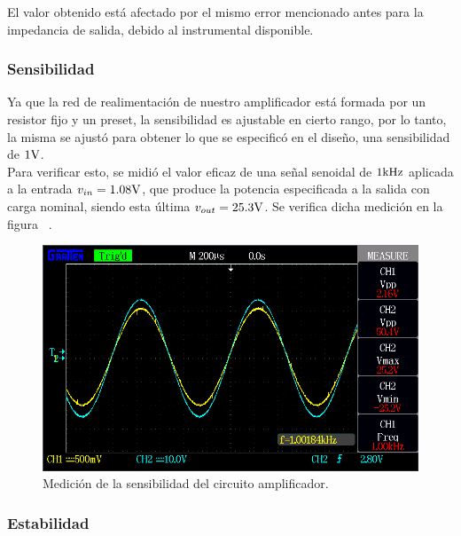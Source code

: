 El valor obtenido está afectado por el mismo error mencionado antes para la impedancia de salida, debido al instrumental disponible.


\vfill

\clearpage


\subsubsection{Sensibilidad}

Ya que la red de realimentación de nuestro amplificador está formada por un resistor fijo y un preset, la sensibilidad es ajustable en cierto rango, por lo tanto, la misma se ajustó para obtener lo que se especificó en el diseño, una sensibilidad de $1 \si[per-mode=symbol]{\volt}$. \\
Para verificar esto, se midió el valor eficaz de una señal senoidal de $1 \si[per-mode=symbol]{\kilo\hertz}$ aplicada a la entrada $v_{in}=1.08 \si[per-mode=symbol]{\volt}$, que produce la potencia especificada a la salida con carga nominal, siendo esta última $v_{out}= 25.3 \si[per-mode=symbol]{\volt}$. Se verifica dicha medición en la figura ~.

\begin{figure}[H]
    \centering
    \includegraphics[width=0.95 \textwidth]{./img/mediciones/Sensitivity/1.png}
    \caption{Medición de la sensibilidad del circuito amplificador.}
    \label{fig:Sensitivity}
\end{figure}

\clearpage




\subsubsection{Estabilidad}

